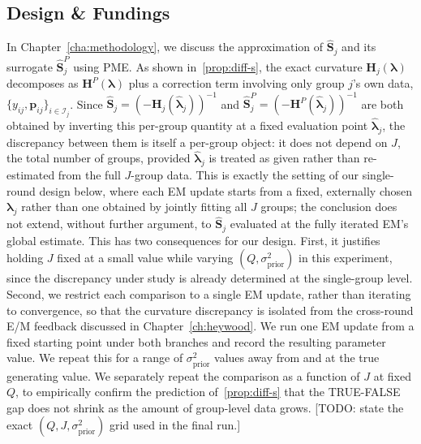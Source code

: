 \subsection{Design \& Fundings}

In Chapter~\ref{cha:methodology}, we discuss the approximation of $\hat{\mathbf{S}}_{j}$ and its surrogate $\hat{\mathbf{S}}^{P}_{j}$ using PME. As shown in~\ref{prop:diff-s}, the exact curvature $\mathbf{H}_j(\boldsymbol\lambda)$ decomposes as $\mathbf{H}^P(\boldsymbol\lambda)$ plus a correction term involving only group $j$'s own data, $\{y_{ij}, \mathbf{p}_{ij}\}_{i \in \mathcal{I}_j}$. Since $\hat{\mathbf{S}}_j = \left(-\mathbf{H}_j(\hat{\boldsymbol\lambda}_j)\right)^{-1}$ and $\hat{\mathbf{S}}^P_j = \left(-\mathbf{H}^P(\hat{\boldsymbol\lambda}_j)\right)^{-1}$ are both obtained by inverting this per-group quantity at a fixed evaluation point $\hat{\boldsymbol\lambda}_j$, the discrepancy between them is itself a per-group object: it does not depend on $J$, the total number of groups, provided $\hat{\boldsymbol\lambda}_j$ is treated as given rather than re-estimated from the full $J$-group data. This is exactly the setting of our single-round design below, where each EM update starts from a fixed, externally chosen $\boldsymbol\lambda_j$ rather than one obtained by jointly fitting all $J$ groups; the conclusion does not extend, without further argument, to $\hat{\mathbf{S}}_j$ evaluated at the fully iterated EM's global estimate. This has two consequences for our design. First, it justifies holding $J$ fixed at a small value while varying $(Q, \sigma^2_{\mathrm{prior}})$ in this experiment, since the discrepancy under study is already determined at the single-group level. Second, we restrict each comparison to a single EM update, rather than iterating to convergence, so that the curvature discrepancy is isolated from the cross-round E/M feedback discussed in Chapter~\ref{ch:heywood}. We run one EM update from a fixed starting point under both branches and record the resulting parameter value. We repeat this for a range of $\sigma^2_{\mathrm{prior}}$ values away from and at the true generating value. We separately repeat the comparison as a function of $J$ at fixed $Q$, to empirically confirm the prediction of~\ref{prop:diff-s} that the TRUE-FALSE gap does not shrink as the amount of group-level data grows. [TODO: state the exact $(Q, J, \sigma^2_{\mathrm{prior}})$ grid used in the final run.]
\iffalse
\begin{table}[htbp]
\centering
% 
\caption{Gap between exact-curvature and surrogate-curvature single-round updates, as a function of $Q$ and $\sigma^2_{\mathrm{prior}}$.}
\label{tab:exact-shat-gap-Q}
\end{table}

